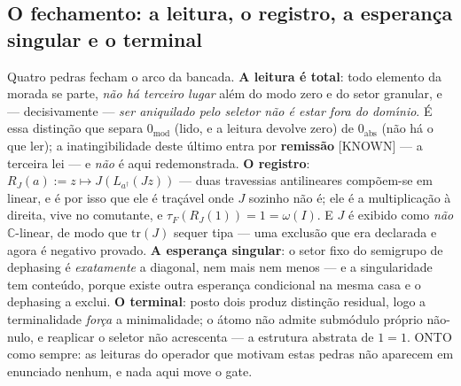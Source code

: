 \documentclass[11pt]{article}
\theoremstyle{definition}\newtheorem{deriv}{Derivação}
\begin{document}
\subsection*{O fechamento: a leitura, o registro, a esperan\c{c}a singular e o terminal}Quatro pedras fecham o arco da bancada. \textbf{A leitura \'e total}: todo elemento da morada se parte, \emph{n\~ao h\'a terceiro lugar} al\'em do modo zero e do setor granular, e --- decisivamente --- \emph{ser aniquilado pelo seletor n\~ao \'e estar fora do dom\'\i{}nio}. \'E essa distin\c{c}\~ao que separa $0_{\mathrm{mod}}$ (lido, e a leitura devolve zero) de $0_{\mathrm{abs}}$ (n\~ao h\'a o que ler); a inatingibilidade deste \'ultimo entra por \textbf{remiss\~ao} \textsf{[KNOWN]} --- a terceira lei --- e \emph{n\~ao} \'e aqui redemonstrada. \textbf{O registro}: $R_J(a) := z \mapsto J(L_{a^\dagger}(J z))$ --- duas travessias antilineares comp\~oem-se em linear, e \'e por isso que ele \'e tra\c{c}\'avel onde $J$ sozinho n\~ao \'e; ele \'e a multiplica\c{c}\~ao \`a direita, vive no comutante, e $\tau_F(R_J(1)) = 1 = \omega(I)$. E $J$ \'e exibido como \emph{n\~ao} $\mathbb{C}$-linear, de modo que $\mathrm{tr}(J)$ sequer tipa --- uma exclus\~ao que era declarada e agora \'e negativo provado. \textbf{A esperan\c{c}a singular}: o setor fixo do semigrupo de dephasing \'e \emph{exatamente} a diagonal, nem mais nem menos --- e a singularidade tem conte\'udo, porque existe outra esperan\c{c}a condicional na mesma casa e o dephasing a exclui. \textbf{O terminal}: posto dois produz distin\c{c}\~ao residual, logo a terminalidade \emph{for\c{c}a} a minimalidade; o \'atomo n\~ao admite subm\'odulo pr\'oprio n\~ao-nulo, e reaplicar o seletor n\~ao acrescenta --- a estrutura abstrata de $1=1$. \textsf{ONTO} como sempre: as leituras do operador que motivam estas pedras n\~ao aparecem em enunciado nenhum, e nada aqui move o gate.
\end{document}
